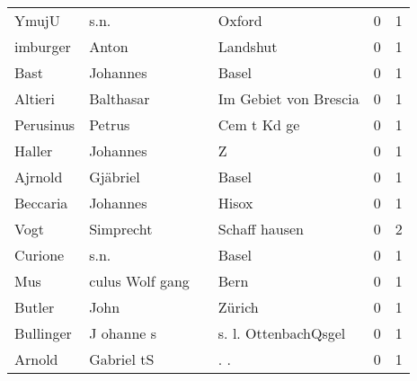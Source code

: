 \begin{tabular}{llllrr}
                    YmujU &                               s.n. &             &                                      Oxford &          0 &         1 \\
                 imburger &                              Anton &             &                                    Landshut &          0 &         1 \\
                     Bast &                           Johannes &             &                                       Basel &          0 &         1 \\
                  Altieri &                          Balthasar &             &                       Im Gebiet von Brescia &          0 &         1 \\
                Perusinus &                             Petrus &             &                                 Cem t Kd ge &          0 &         1 \\
                   Haller &                           Johannes &             &                                           Z &          0 &         1 \\
                  Ajrnold &                           Gjäbriel &             &                                       Basel &          0 &         1 \\
                 Beccaria &                           Johannes &             &                                       Hisox &          0 &         1 \\
                     Vogt &                          Simprecht &             &                               Schaff hausen &          0 &         2 \\
                  Curione &                               s.n. &             &                                       Basel &          0 &         1 \\
                      Mus &                    culus Wolf gang &             &                                        Bern &          0 &         1 \\
                   Butler &                               John &             &                                      Zürich &          0 &         1 \\
                Bullinger &                         J ohanne s &             &                        s. l. OttenbachQsgel &          0 &         1 \\
                   Arnold &                         Gabriel tS &             &                                        . .  &          0 &         1 \\

\end{tabular}

